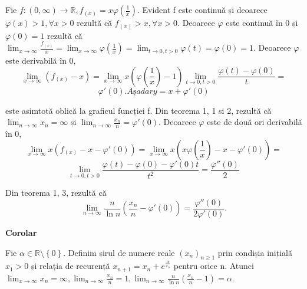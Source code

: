 \documentclass[a4paper,12pt,oneside]{report}
\begin{document}
Fie \(f : \left ( 0,\infty  \right ) \to \mathbb{R}, f_{\left ( x \right )}= x\varphi \left ( \frac{1}{x} \right )\). Evident f este continuă și deoarece \(\varphi \left ( x \right )> 1,\forall x> 0\) rezultă că \(f_{\left ( x \right )}> x, \forall x> 0\). Deoarece \(\varphi\) este continuă în 0 și \(\varphi \left ( 0 \right )= 1\) rezultă că \(\lim_{x \to \infty }\frac{f_{\left ( x \right )}}{x} = \lim_{x \to \infty } \varphi \left ( \frac{1}{x} \right ) = \lim_{t \to 0, t> 0 }\varphi \left ( t \right ) = \varphi \left ( 0 \right ) = 1\). Deoarece \(\varphi\) este derivabilă în 0, 
\begin{displaymath}
  \lim_{x \to \infty }\left ( f_{\left ( x \right )} -x\right ) = \lim_{x \to \infty } x\left ( \varphi \left ( \frac{1}{x} \right ) -1\right )\lim_{t \to 0, t> 0}\frac{\varphi \left ( t \right ) - \varphi \left ( 0 \right )}{t} = 
\end{displaymath}
\begin{displaymath}
  {\varphi }'\left ( 0 \right ). Așadar y = x +{\varphi }'\left ( 0 \right )
\end{displaymath}

 
este asimtotă oblică la graficul funcției f. Din teorema 1, 1 si 2, rezultă că \(\lim_{n \to \infty }x_{n} = \infty\) și \(\lim_{n \to \infty }\frac{x_{n}}{n} = {\varphi }'\left ( 0 \right )\). Deoarece \(\varphi\) este de două ori derivabilă în 0,
\begin{displaymath}
  \lim_{x \to \infty }x\left ( f_{\left ( x \right ) } -x-{\varphi }'\left ( 0 \right )\right ) = \lim_{x \to \infty }x\left ( x\varphi \left ( \frac{1}{x} \right ) - x - {\varphi }'\left ( 0 \right ) \right ) = \end{displaymath}
\begin{displaymath}
  \lim_{t \to 0, t> 0}\frac{\varphi \left ( t \right ) - \varphi \left ( 0 \right )- {\varphi }'\left ( 0 \right )t}{t^{2}} = \frac{{\varphi }''\left ( 0 \right )}{2}
\end{displaymath}

Din teorema 1, 3, rezultă că 
\begin{displaymath}
  \lim_{n \to \infty }\frac{n}{\ln n }\left ( \frac{x_{n}}{n}  - {\varphi }'\left ( 0 \right )\right ) = \frac{{\varphi }''\left ( 0 \right )}{2{\varphi }'\left ( 0 \right )}.
\end{displaymath}
 

\textbf{Corolar} 

Fie \(\alpha \in \mathbb{R} \setminus \left \{ 0 \right \}\). Definim șirul de numere reale \(\left ( x_{n} \right )_{n\geq 1}\) prin condișia inițială \(x_{1}> 0\) și relația de recurență \(x_{n+1}= x_{n}+ e^{\frac{\alpha }{x_{n}}}\) pentru orice n. 
Atunci \(\lim_{x \to \infty }x_{n} = \infty , \lim_{n \to \infty }\frac{x_{n}}{n} = 1, \lim_{n \to \infty }\frac{n}{\ln n }\left ( \frac{x_{n}}{n} -1\right ) = \alpha\). 
\end{document}
